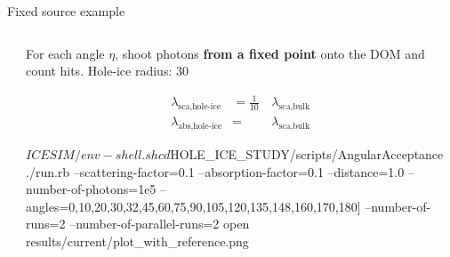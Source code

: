 
\begin{frame}[fragile]{Fixed source example}

  \begin{columns}
    \begin{column}{0.5\textwidth}
    \end{column}
    \begin{column}{0.5\textwidth}

      For each angle $\eta$, shoot photons \textbf{from a fixed point} onto the DOM and count hits.
      \small{Hole-ice radius: 30\cm}

      \begin{equation*}\begin{align}
        \lambda_\text{sca,hole-ice} &= \frac{1}{10}\, & \lambda_\text{sca,bulk} \\
        \lambda_\text{abs,hole-ice} &= & \lambda_\text{sca,bulk}
      \end{align}\end{equation*}

      \begin{smallbash}
        $ICESIM/env-shell.sh
        cd $HOLE_ICE_STUDY/scripts/AngularAcceptance
        ./run.rb --scattering-factor=0.1 --absorption-factor=0.1 --distance=1.0 --number-of-photons=1e5 --angles=0,10,20,30,32,45,60,75,90,105,120,135,148,160,170,180] --number-of-runs=2 --number-of-parallel-runs=2
        open results/current/plot_with_reference.png
      \end{smallbash}

    \end{column}
  \end{columns}


\end{frame}

